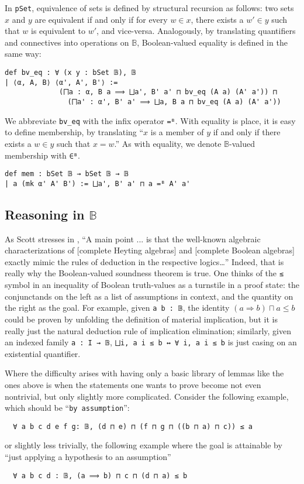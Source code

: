 \documentclass[a4paper,USenglish,cleveref, autoref]{lipics-v2019}
\newcommand{\B}{\mathbb{B}}
\newcommand{\lil}{\lstinline}
\begin{document}
In \lil{pSet}, equivalence of sets is defined by structural recursion as follows: two sets $x$ and $y$ are equivalent if and only if for every $w \in x$, there exists a $w' \in y$ such that $w$ is equivalent to $w'$, and vice-versa. Analogously, by translating quantifiers and connectives into operations on $\B$, Boolean-valued equality is defined in the same way:
\begin{lstlisting}
def bv_eq : ∀ (x y : bSet 𝔹), 𝔹
| ⟨α, A, B⟩ ⟨α', A', B'⟩ :=
             (⨅a : α, B a ⟹ ⨆a', B' a' ⊓ bv_eq (A a) (A' a')) ⊓
               (⨅a' : α', B' a' ⟹ ⨆a, B a ⊓ bv_eq (A a) (A' a'))
\end{lstlisting}

We abbreviate \lil{bv_eq} with the infix operator \lil{=ᴮ}. With equality is place, it is easy to define membership, by translating ``$x$ is a member of $y$ if and only if there exists a $w \in y$ such that $x = w$.'' As with equality, we denote $\B$-valued membership with \lil{∈ᴮ}.
             
\begin{lstlisting}
def mem : bSet 𝔹 → bSet 𝔹 → 𝔹
| a (mk α' A' B') := ⨆a', B' a' ⊓ a =ᴮ A' a'
\end{lstlisting}

\subsection{Reasoning in $\B$}
As Scott stresses in \cite{scott3}, ``A main point ... is that the well-known algebraic characterizations of [complete Heyting algebras] and [complete Boolean algebras] exactly mimic the rules of deduction in the respective logics\ldots{}'' Indeed, that is really why the Boolean-valued soundness theorem is true. One thinks of the \lil{≤} symbol in an inequality of Boolean truth-values as a turnstile in a proof state: the conjunctands on the left as a list of assumptions in context, and the quantity on the right as the goal. For example, given \lil{a b : 𝔹}, the identity $(a \Rightarrow b) \sqcap a \leq b$ could be proven by unfolding the definition of material implication, but it is really just the natural deduction rule of implication elimination; similarly, given an indexed family \lil{a : I → 𝔹}, \lstinline{⨆i, a i ≤ b ↔ ∀ i, a i ≤ b} is just casing on an existential quantifier.

Where the difficulty arises with having only a basic library of lemmas like the ones above is when the statements one wants to prove become not even nontrivial, but only slightly more complicated. Consider the following example, which should be  ``\lil{by assumption}'':
\begin{lstlisting}
  ∀ a b c d e f g: 𝔹, (d ⊓ e) ⊓ (f ⊓ g ⊓ ((b ⊓ a) ⊓ c)) ≤ a
\end{lstlisting}
or slightly less trivially, the following example where the goal is attainable by ``just applying a hypothesis to an assumption''
\begin{lstlisting}
  ∀ a b c d : 𝔹, (a ⟹ b) ⊓ c ⊓ (d ⊓ a) ≤ b
\end{lstlisting}
\end{document}
